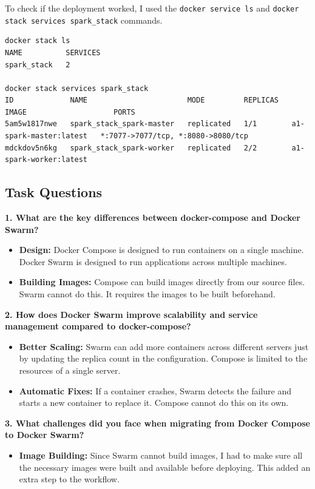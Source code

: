 \documentclass[11pt,a4paper]{article}
\begin{document}
To check if the deployment worked, I used the \texttt{docker service ls} and \texttt{docker stack services spark\_stack} commands.
\begin{lstlisting}[style=shell]
docker stack ls                  
NAME          SERVICES
spark_stack   2

docker stack services spark_stack
ID             NAME                       MODE         REPLICAS   IMAGE                    PORTS
5am5w1817nwe   spark_stack_spark-master   replicated   1/1        a1-spark-master:latest   *:7077->7077/tcp, *:8080->8080/tcp
mdckdov5n6kg   spark_stack_spark-worker   replicated   2/2        a1-spark-worker:latest  
\end{lstlisting}

\subsection{Task Questions}

\textbf{1. What are the key differences between docker-compose and Docker Swarm?}
\begin{itemize}
    \item \textbf{Design:} Docker Compose is designed to run containers on a single machine. Docker Swarm is designed to run applications across multiple machines.
    \item \textbf{Building Images:} Compose can build images directly from our source files. Swarm cannot do this. It requires the images to be built beforehand.
\end{itemize}

\textbf{2. How does Docker Swarm improve scalability and service management compared to docker-compose?}
\begin{itemize}
    \item \textbf{Better Scaling:} Swarm can add more containers across different servers just by updating the replica count in the configuration. Compose is limited to the resources of a single server.
    \item \textbf{Automatic Fixes:} If a container crashes, Swarm detects the failure and starts a new container to replace it. Compose cannot do this on its own.
\end{itemize}

\textbf{3. What challenges did you face when migrating from Docker Compose to Docker Swarm?}
\begin{itemize}
    \item \textbf{Image Building:} Since Swarm cannot build images, I had to make sure all the necessary images were built and available before deploying. This added an extra step to the workflow.
\end{itemize}

\end{document}
